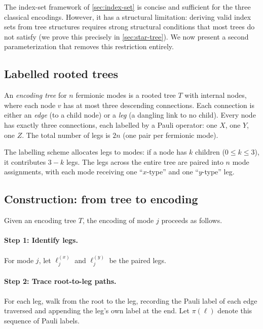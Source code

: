 
The index-set framework of \cref{sec:index-set} is concise and
sufficient for the three classical encodings.  However, it has a
structural limitation: deriving valid index sets from tree structures
requires strong structural conditions that most trees do not satisfy
(we prove this precisely in \cref{sec:star-tree}).  We now present a
second parameterization that removes this restriction entirely.

\subsection{Labelled rooted trees}

\begin{definition}
\label{def:encoding-tree}
An \emph{encoding tree} for $n$ fermionic modes is a rooted tree $T$
with internal nodes, where each node $v$ has at most three descending
connections.  Each connection is either an \emph{edge} (to a child
node) or a \emph{leg} (a dangling link to no child).  Every node has
exactly three connections, each labelled by a Pauli operator:
one $X$, one $Y$, one $Z$.  The total number of legs is $2n$ (one pair
per fermionic mode).
\end{definition}

\noindent
The labelling scheme allocates legs to modes: if a node has $k$ children
($0 \le k \le 3$), it contributes $3 - k$ legs.  The legs across the
entire tree are paired into $n$ mode assignments, with each mode
receiving one ``$x$-type'' and one ``$y$-type'' leg.

\subsection{Construction: from tree to encoding}

Given an encoding tree $T$, the encoding of mode $j$ proceeds as
follows.

\paragraph{Step 1: Identify legs.}
For mode $j$, let $\ell_j^{(x)}$ and $\ell_j^{(y)}$ be the paired
legs.

\paragraph{Step 2: Trace root-to-leg paths.}
For each leg, walk from the root to the leg, recording the Pauli
label of each edge traversed and appending the leg's own label at the
end.  Let $\pi(\ell)$ denote this sequence of Pauli labels.

